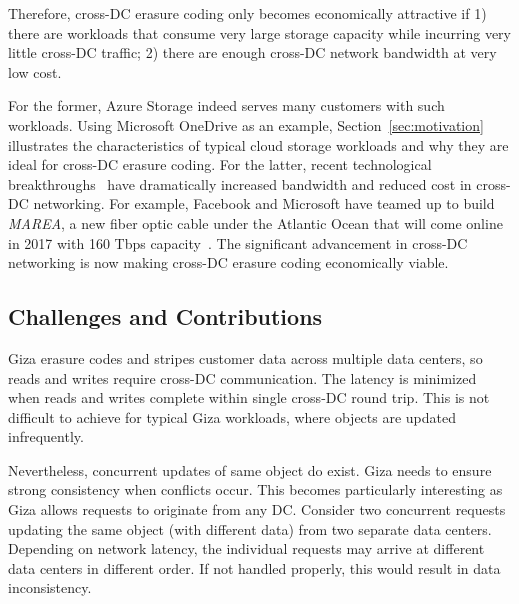 Therefore, cross-DC erasure coding only becomes economically attractive if 1)
there are workloads that consume very large storage capacity while incurring very
little cross-DC traffic; 2) there are enough cross-DC network bandwidth at very
low cost.

For the former, Azure Storage indeed serves many customers
with such workloads. Using Microsoft OneDrive as an example,
Section~\ref{sec:motivation} illustrates the characteristics of typical cloud storage workloads
and why they are ideal for cross-DC erasure coding.
For the latter, recent technological breakthroughs~\cite{mears1986low, zhu2011112}
have dramatically increased bandwidth and reduced cost in cross-DC networking.
For example, Facebook and Microsoft have teamed up to build \textit{MAREA},
a new fiber optic cable under the Atlantic Ocean 
that will come online in 2017 with 160 Tbps capacity~\cite{bib:MAREA1, bib:MAREA2}.
The significant advancement in cross-DC networking is now making cross-DC erasure coding economically viable.


\subsection{Challenges and Contributions}

Giza erasure codes and stripes customer data across multiple data centers,
so reads and writes require cross-DC communication. The latency is minimized when
reads and writes complete within single cross-DC round trip. This is not
difficult to achieve for typical Giza workloads, where objects are updated
infrequently.

Nevertheless, concurrent updates of same object do exist.
Giza needs to ensure strong consistency when conflicts occur. This becomes
particularly interesting as Giza allows requests to originate from any DC.
Consider two concurrent requests updating the same object (with different data)
from two separate data centers. Depending on network latency, the individual requests may
arrive at different data centers in different order. If not handled properly,
this would result in data inconsistency.

